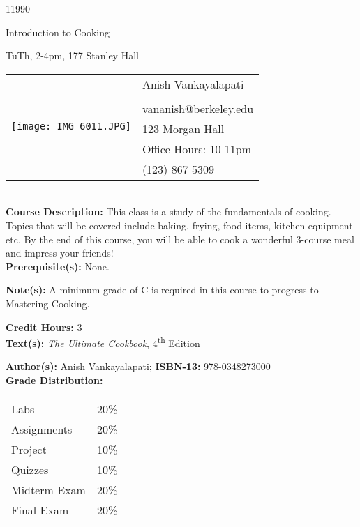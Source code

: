 \documentclass[11pt]{article}
\begin{document}
\LARGE 11990

\LARGE Introduction to Cooking

\LARGE TuTh, 2-4pm, 177 Stanley Hall

\vspace{10mm}

\begin{tabular}{ l l }
  \multirow{6}{*}{\texttt{[image: IMG\_6011.JPG]}} & \large Anish Vankayalapati \\\\
  & \large vananish@berkeley.edu \\
  & \large 123 Morgan Hall \\
  & \large Office Hours: 10-11pm \\
  & \large (123) 867-5309 \\
\end{tabular}
\vspace{10mm}
\\

\textbf {Course Description:} This class is a study of the fundamentals of cooking. Topics that will be covered include baking, frying, food items, kitchen equipment etc. By the end of this course, you will be able to cook a wonderful 3-course meal and impress your friends! \\
\textbf {Prerequisite(s):} None.

\textbf {Note(s):} A minimum grade of C is required in this course to progress to Mastering Cooking. 

\textbf {Credit Hours:} 3 \\

\textbf {\large Text(s):} \emph{The Ultimate Cookbook}, 4\textsuperscript{th} Edition

\textbf {Author(s):} Anish Vankayalapati;  \textbf {ISBN-13:} 978-0348273000 \\


\textbf {\large Grade Distribution:} \\
\hspace*{40mm}
\begin{tabular}{ l l }
Labs & 20\% \\
Assignments & 20\% \\
Project & 10\% \\
Quizzes  & 10\% \\
Midterm Exam  & 20\% \\
Final Exam  & 20\%
\end{tabular} \\\\
\end{document}

